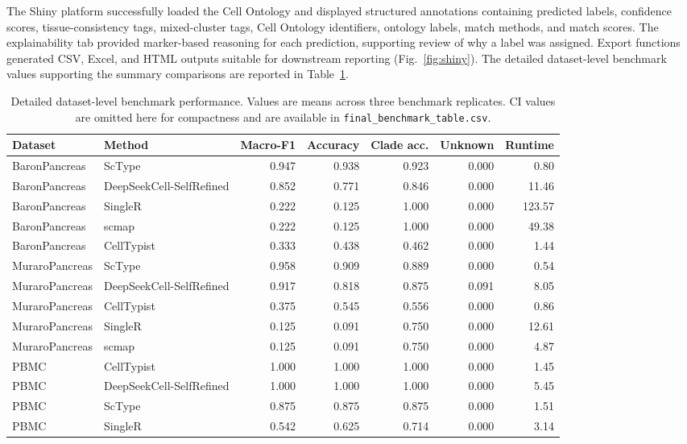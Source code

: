 \documentclass[referee,lineno,pdflatex]{sn-jnl}
\begin{document}
The Shiny platform successfully loaded the Cell Ontology and displayed structured annotations containing predicted labels, confidence scores, tissue-consistency tags, mixed-cluster tags, Cell Ontology identifiers, ontology labels, match methods, and match scores. The explainability tab provided marker-based reasoning for each prediction, supporting review of why a label was assigned. Export functions generated CSV, Excel, and HTML outputs suitable for downstream reporting (Fig.~\ref{fig:shiny}). The detailed dataset-level benchmark values supporting the summary comparisons are reported in Table~\ref{tab:detailed}.

\begin{table}[htp]
\caption{Detailed dataset-level benchmark performance. Values are means across three benchmark replicates. CI values are omitted here for compactness and are available in \texttt{final\_benchmark\_table.csv}.}\label{tab:detailed}
\scriptsize
\begin{tabularx}{\textwidth}{@{}lXrrrrr@{}}
\toprule
Dataset & Method & Macro-F1 & Accuracy & Clade acc. & Unknown & Runtime\\
\midrule
BaronPancreas & ScType & 0.947 & 0.938 & 0.923 & 0.000 & 0.80\\
BaronPancreas & DeepSeekCell-SelfRefined & 0.852 & 0.771 & 0.846 & 0.000 & 11.46\\
BaronPancreas & SingleR & 0.222 & 0.125 & 1.000 & 0.000 & 123.57\\
BaronPancreas & scmap & 0.222 & 0.125 & 1.000 & 0.000 & 49.38\\
BaronPancreas & CellTypist & 0.333 & 0.438 & 0.462 & 0.000 & 1.44\\
MuraroPancreas & ScType & 0.958 & 0.909 & 0.889 & 0.000 & 0.54\\
MuraroPancreas & DeepSeekCell-SelfRefined & 0.917 & 0.818 & 0.875 & 0.091 & 8.05\\
MuraroPancreas & CellTypist & 0.375 & 0.545 & 0.556 & 0.000 & 0.86\\
MuraroPancreas & SingleR & 0.125 & 0.091 & 0.750 & 0.000 & 12.61\\
MuraroPancreas & scmap & 0.125 & 0.091 & 0.750 & 0.000 & 4.87\\
PBMC & CellTypist & 1.000 & 1.000 & 1.000 & 0.000 & 1.45\\
PBMC & DeepSeekCell-SelfRefined & 1.000 & 1.000 & 1.000 & 0.000 & 5.45\\
PBMC & ScType & 0.875 & 0.875 & 0.875 & 0.000 & 1.51\\
PBMC & SingleR & 0.542 & 0.625 & 0.714 & 0.000 & 3.14\\

\end{tabularx}
\end{table}
\end{document}
